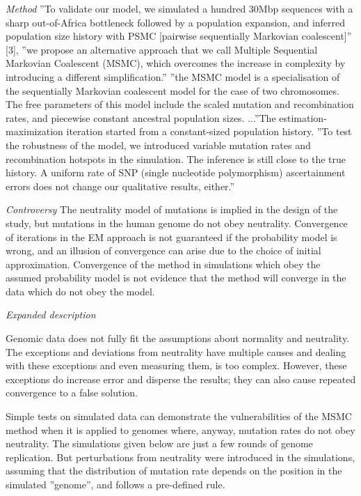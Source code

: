 \documentclass[12pt,aps]{revtex4}
\begin{document}
\emph{Method} ”To validate our model, we simulated a hundred 30Mbp sequences with a sharp out-of-Africa bottleneck followed by a population expansion, and inferred population size history with PSMC [pairwise sequentially Markovian coalescent]” [3], ”we propose an alternative approach that we call Multiple Sequential Markovian Coalescent (MSMC), which overcomes the increase in complexity by introducing a different simplification.” ”the MSMC model is a specialisation of the sequentially Markovian coalescent model for the case of two chromosomes. The free parameters of this model include the scaled mutation and recombination rates, and piecewise constant ancestral population sizes. ...”The estimation-maximization iteration started from a constant-sized population history. ”To test the robustness of the model, we introduced variable mutation rates and recombination hotspots in the simulation. The inference is still close to the true history. A uniform rate of SNP (single nucleotide polymorphism) ascertainment errors does not change our qualitative results, either.”

\emph{Controversy} The neutrality model of mutations is implied in the design of the study, but mutations in the human genome do not obey neutrality. Convergence of iterations in the EM approach is not guaranteed if the probability model is wrong, and an illusion of convergence can arise due to the choice of initial approximation. Convergence of the method in simulations which obey the assumed probability model is not evidence that the method will converge in the data which do not obey the model.

\emph{Expanded description}

Genomic data does not fully fit the assumptions about normality and neutrality. The exceptions and deviations from neutrality have multiple causes and dealing with these exceptions and even measuring them, is too complex. However, these exceptions do increase error and disperse the results; they can also cause repeated convergence to a false solution.

Simple tests on simulated data can demonstrate the vulnerabilities of the MSMC method when it is applied to genomes where, anyway, mutation rates do not obey neutrality. The simulations given below are just a few rounds of genome replication. But perturbations from neutrality were introduced in the simulations, assuming that the distribution of mutation rate depends on the position in the simulated ”genome”, and follows a pre-defined rule.
\end{document}

